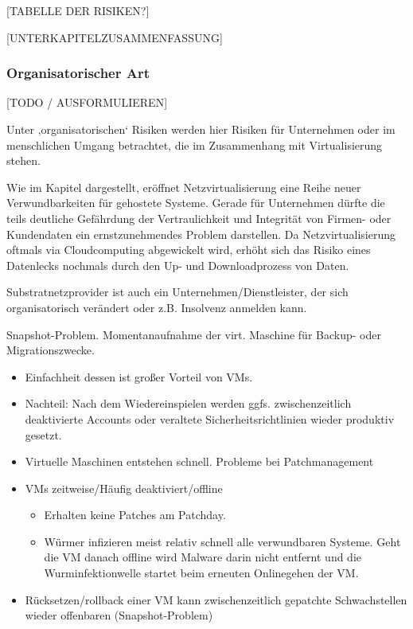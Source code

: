 [TABELLE DER RISIKEN?]



[UNTERKAPITELZUSAMMENFASSUNG]


\subsubsection{Organisatorischer Art}
\label{subsubsec:gefahren_virt_organisatorisch}
[TODO / AUSFORMULIEREN]

Unter ‚organisatorischen‘ Risiken werden hier Risiken für Unternehmen oder im menschlichen Umgang betrachtet, die im Zusammenhang mit Virtualisierung stehen.

Wie im Kapitel  dargestellt, eröffnet Netzvirtualisierung eine Reihe neuer Verwundbarkeiten für gehostete Systeme. Gerade für Unternehmen dürfte die teils deutliche Gefährdung der Vertraulichkeit und Integrität von Firmen- oder Kundendaten ein ernstzunehmendes Problem darstellen. Da Netzvirtualisierung oftmals via Cloudcomputing abgewickelt wird, erhöht sich das Risiko eines Datenlecks nochmals durch den Up- und Downloadprozess von Daten.

Substratnetzprovider ist auch ein Unternehmen/Dienstleister, der sich organisatorisch verändert oder z.B. Insolvenz anmelden kann.

Snapshot-Problem. Momentanaufnahme der virt. Maschine für Backup- oder Migrationszwecke. 
\begin{itemize}
\item Einfachheit dessen ist großer Vorteil von VMs. 
\item Nachteil: Nach dem Wiedereinspielen werden ggfs. zwischenzeitlich deaktivierte Accounts oder veraltete Sicherheitsrichtlinien wieder produktiv gesetzt.
\item Virtuelle Maschinen entstehen schnell. Probleme bei Patchmanagement 
\item VMs zeitweise/Häufig deaktiviert/offline
\begin{itemize}
	\item Erhalten keine Patches am Patchday.
	\item Würmer infizieren meist relativ schnell alle verwundbaren Systeme. Geht die VM danach offline wird Malware darin nicht entfernt und die Wurminfektionwelle startet beim erneuten Onlinegehen der VM.
\end{itemize}
\item Rücksetzen/rollback einer VM kann zwischenzeitlich gepatchte Schwachstellen wieder offenbaren (Snapshot-Problem)
\end{itemize}





